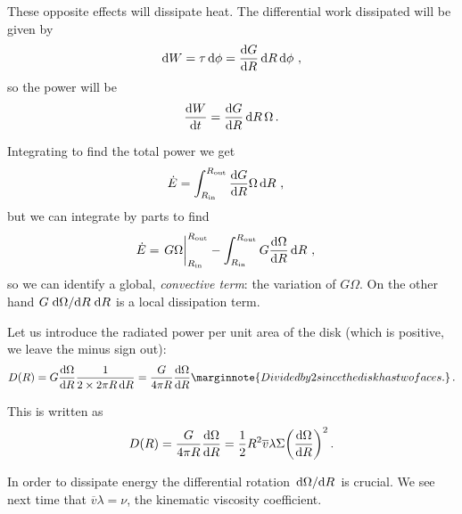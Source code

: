 \documentclass[main.tex]{subfiles}
\begin{document}
These opposite effects will dissipate heat. 
The differential work dissipated will be given by 
%
\begin{align}
\dd{W} = \tau \dd{\phi } = \dv{G}{R} \dd{R} \dd{\phi }
\,,
\end{align}
%
so the power will be 
%
\begin{align}
\dv{W}{t} = \dv{G}{R} \dd{R} \Omega 
\,.
\end{align}

Integrating to find the total power we get
%
\begin{align}
\dot{E} &= \int_{R _{\text{in}}}^{R _{\text{out}} } \dv{G}{R} \Omega \dd{R} 
\,,
\end{align}
%
but we can integrate by parts to find 
%
\begin{align}
\dot{E} &= \eval{G \Omega }_{R _{\text{in}}}^{R _{\text{out}}}
- \int_{R _{\text{in}}}^{R _{\text{out}}} G \dv{\Omega }{R} \dd{R} 
\,,
\end{align}
%
so we can identify a global, \emph{convective term}: the variation of \(G \Omega \). On the other hand \(G \dv*{\Omega }{R} \dd{R}\) is a local dissipation term. 

Let us introduce the radiated power per unit area of the disk (which is positive, we leave the minus sign out):
%
\begin{align}
D(R) = G \dv{\Omega }{R} \frac{1}{2 \times 2 \pi R \dd{R}} = \frac{G}{4 \pi R} \dv{\Omega }{R} \marginnote{Divided by 2 since the disk has two faces.} 
\,.
\end{align}

This is written as 
%
\begin{align}
D(R) = \frac{G}{4 \pi R} \dv{\Omega }{R}
= \frac{1}{2} R^2 \overline{v} \lambda \Sigma \qty(\dv{\Omega }{R})^2
\,.
\end{align}

In order to dissipate energy the differential rotation \(\dv*{\Omega }{R}\) is crucial. 
We see next time that  \(\overline{v} \lambda = \nu \), the kinematic viscosity coefficient.
\end{document}
